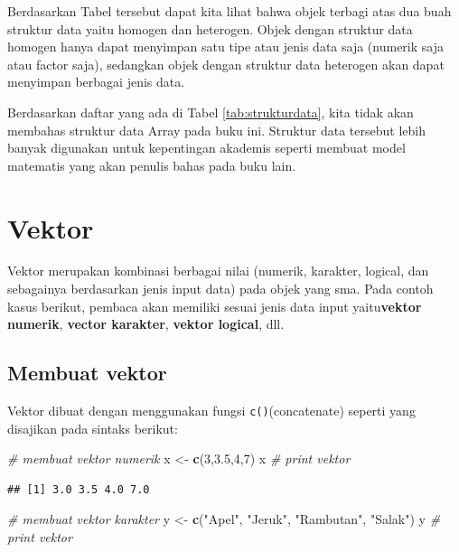 \documentclass[]{book}
\newenvironment{Shaded}{\begin{snugshade}}{\end{snugshade}}
\newcommand{\KeywordTok}[1]{\textcolor[rgb]{0.13,0.29,0.53}{\textbf{#1}}}
\newcommand{\DecValTok}[1]{\textcolor[rgb]{0.00,0.00,0.81}{#1}}
\newcommand{\FloatTok}[1]{\textcolor[rgb]{0.00,0.00,0.81}{#1}}
\newcommand{\StringTok}[1]{\textcolor[rgb]{0.31,0.60,0.02}{#1}}
\newcommand{\CommentTok}[1]{\textcolor[rgb]{0.56,0.35,0.01}{\textit{#1}}}
\newcommand{\NormalTok}[1]{#1}
\begin{document}
Berdasarkan Tabel tersebut dapat kita lihat bahwa objek terbagi atas dua
buah struktur data yaitu homogen dan heterogen. Objek dengan struktur
data homogen hanya dapat menyimpan satu tipe atau jenis data saja
(numerik saja atau factor saja), sedangkan objek dengan struktur data
heterogen akan dapat menyimpan berbagai jenis data.

Berdasarkan daftar yang ada di Tabel \ref{tab:strukturdata}, kita tidak
akan membahas struktur data Array pada buku ini. Struktur data tersebut
lebih banyak digunakan untuk kepentingan akademis seperti membuat model
matematis yang akan penulis bahas pada buku lain.

\section{Vektor}\label{vektor}

Vektor merupakan kombinasi berbagai nilai (numerik, karakter, logical,
dan sebagainya berdasarkan jenis input data) pada objek yang sma. Pada
contoh kasus berikut, pembaca akan memiliki sesuai jenis data input
yaitu\textbf{vektor numerik}, \textbf{vector karakter}, \textbf{vektor
logical}, dll.

\subsection{Membuat vektor}\label{membuat-vektor}

Vektor dibuat dengan menggunakan fungsi \texttt{c()}(concatenate)
seperti yang disajikan pada sintaks berikut:

\begin{Shaded}
\begin{Highlighting}[]
\CommentTok{# membuat vektor numerik}
\NormalTok{x <-}\StringTok{ }\KeywordTok{c}\NormalTok{(}\DecValTok{3}\NormalTok{,}\FloatTok{3.5}\NormalTok{,}\DecValTok{4}\NormalTok{,}\DecValTok{7}\NormalTok{)}
\NormalTok{x }\CommentTok{# print vektor}
\end{Highlighting}
\end{Shaded}

\begin{verbatim}
## [1] 3.0 3.5 4.0 7.0
\end{verbatim}

\begin{Shaded}
\begin{Highlighting}[]
\CommentTok{# membuat vektor karakter}
\NormalTok{y <-}\StringTok{ }\KeywordTok{c}\NormalTok{(}\StringTok{"Apel"}\NormalTok{, }\StringTok{"Jeruk"}\NormalTok{, }\StringTok{"Rambutan"}\NormalTok{, }\StringTok{"Salak"}\NormalTok{)}
\NormalTok{y }\CommentTok{# print vektor}
\end{Highlighting}
\end{Shaded}
\end{document}
